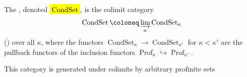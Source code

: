 \begin{definition} \label{definition:category_of_condensed_sets}
    The , denoted \hl{$\operatorname{CondSet}$}, is the colimit category 
    $$\operatorname{CondSet} \coloneq \varinjlim_{\kappa} \operatorname{CondSet}_\kappa$$
    () over all  $\kappa$, where the functors $\operatorname{CondSet}_{\kappa} \to \operatorname{CondSet}_{\kappa'}$ for $\kappa < \kappa'$ are the pullback functors of the inclusion functors $\operatorname{Prof}_{\kappa} \hookrightarrow \operatorname{Prof}_{\kappa'}$.

    This category is generated under colimits by arbitrary profinite sets 
\end{definition}